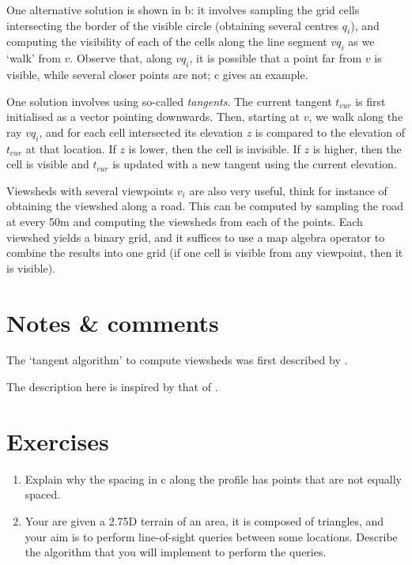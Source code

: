 %

One alternative solution is shown in b: it involves sampling the grid cells intersecting the border of the visible circle (obtaining several centres $q_i$), and computing the visibility of each of the cells along the line segment $vq_i$ as we `walk' from $v$.
Observe that, along $vq_i$, it is possible that a point far from $v$ is visible, while several closer points are not; c gives an example.

One solution involves using so-called \emph{tangents}.
The current tangent $t_{cur}$ is first initialised as a vector pointing downwards.
Then, starting at $v$, we walk along the ray $vq_i$, and for each cell intersected its elevation $z$ is compared to the elevation of $t_{cur}$ at that location.
If $z$ is lower, then the cell is invisible.
If $z$ is higher, then the cell is visible and $t_{cur}$ is updated with a new tangent using the current elevation.

Viewsheds with several viewpoints $v_i$ are also very useful, think for instance of obtaining the viewshed along a road.
This can be computed by sampling the road at every 50m and computing the viewsheds from each of the points. 
Each viewshed yields a binary grid, and it suffices to use a map algebra operator to combine the results into one grid (if one cell is visible from any viewpoint, then it is visible).


%
\section{Notes \& comments}

The `tangent algorithm' to compute viewsheds was first described by \citet{Blelloch90}.

The description here is inspired by that of \citet{DeFloriani99-1}.


%
\section{Exercises}

\begin{enumerate}
  \item Explain why the spacing in c along the profile has points that are not equally spaced.
  \item Your are given a 2.75D terrain of an area, it is composed of triangles, and your aim is to perform line-of-sight queries between some locations. Describe the algorithm that you will implement to perform the queries.
\end{enumerate}
